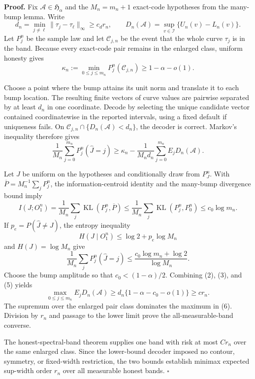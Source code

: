 \textbf{Proof.}
Fix \(\mathcal A\in\mathfrak H_\alpha\) and the \(M_n=m_n+1\) exact-code hypotheses from the many-bump lemma.  Write
\[
 d_n=\min_{j\ne\ell}\|\tau_j-\tau_\ell\|_\infty\ge c_dr_n,
 \qquad
 D_n(\mathcal A)=\sup_{v\in\mathcal I}\{U_n(v)-L_n(v)\}. \tag{1}
\]
Let \(P_j^n\) be the sample law and let \(\mathcal C_{j,n}\) be the event that the whole curve \(\tau_j\) is in the band.  Because every exact-code pair remains in the enlarged class, uniform honesty gives
\[
 \kappa_n:=\min_{0\le j\le m_n}P_j^n(\mathcal C_{j,n})
 \ge1-\alpha-o(1). \tag{2}
\]

Choose a point where the bump attains its unit norm and translate it to each bump location.  The resulting finite vectors of curve values are pairwise separated by at least \(d_n\) in one coordinate.  Decode by selecting the unique candidate vector contained coordinatewise in the reported intervals, using a fixed default if uniqueness fails.  On
\(\mathcal C_{j,n}\cap\{D_n(\mathcal A)<d_n\}\), the decoder is correct.  Markov's inequality therefore gives
\[
 \frac1{M_n}\sum_{j=0}^{m_n}P_j^n(\widehat J=j)
 \ge\kappa_n-\frac1{M_nd_n}
 \sum_{j=0}^{m_n}E_jD_n(\mathcal A). \tag{3}
\]

Let \(J\) be uniform on the hypotheses and conditionally draw from \(P_J^n\).  With
\(\overline P=M_n^{-1}\sum_jP_j^n\), the information-centroid identity and the many-bump divergence bound imply
\[
 I(J;O_1^n)
 =\frac1{M_n}\sum_j\operatorname{KL}(P_j^n,\overline P)
 \le\frac1{M_n}\sum_j\operatorname{KL}(P_j^n,P_0^n)
 \le c_0\log m_n. \tag{4}
\]
If \(p_e=P(\widehat J\ne J)\), the entropy inequality
\[
 H(J\mid O_1^n)\le\log2+p_e\log M_n
\]
and \(H(J)=\log M_n\) give
\[
 \frac1{M_n}\sum_jP_j^n(\widehat J=j)
 \le\frac{c_0\log m_n+\log2}{\log M_n}. \tag{5}
\]
Choose the bump amplitude so that \(c_0<(1-\alpha)/2\).  Combining (2), (3), and (5) yields
\[
 \max_{0\le j\le m_n}E_jD_n(\mathcal A)
 \ge d_n\{1-\alpha-c_0-o(1)\}\ge cr_n. \tag{6}
\]
The supremum over the enlarged pair class dominates the maximum in (6).  Division by \(r_n\) and passage to the lower limit prove the all-measurable-band converse.

The honest-spectral-band theorem supplies one band with risk at most \(Cr_n\) over the same enlarged class.  Since the lower-bound decoder imposed no contour, symmetry, or fixed-width restriction, the two bounds establish minimax expected sup-width order \(r_n\) over all measurable honest bands. \(\square\)